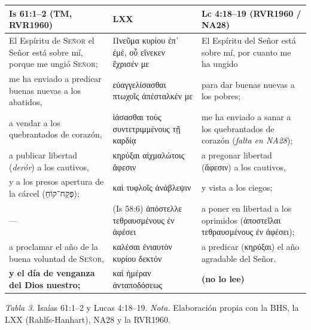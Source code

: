 \documentclass[11pt,letterpaper]{article}
\newcommand{\heb}[1]{\mbox{\foreignlanguage{hebrew}{#1}}}
\newcommand{\grc}[1]{\foreignlanguage{ancientgreek}{#1}}
\newcommand{\SENOR}{\textsc{Señor}}
\newcommand{\destacar}[1]{\textbf{\textcolor{tierraroja}{#1}}}
\newcommand{\pie}[1]{\par{\footnotesize\color{sepia}#1\par}}
\begin{document}
\begin{center}\begin{minipage}{\linewidth}\centering\small\renewcommand{\arraystretch}{1.2}
\begin{tabular}{@{}L{4.4cm}L{4.6cm}L{5.6cm}@{}}
\toprule
\textbf{Is 61:1--2 (TM, RVR1960)} & \textbf{LXX} & \textbf{Lc 4:18--19 (RVR1960 / NA28)} \\ \midrule
El Espíritu de \SENOR{} el Señor está sobre mí, porque me ungió \SENOR; & \grc{Πνεῦμα κυρίου ἐπ᾽ ἐμέ, οὗ εἵνεκεν ἔχρισέν με} & El Espíritu del Señor está sobre mí, por cuanto me ha ungido \\
me ha enviado a predicar buenas nuevas a los abatidos, & \grc{εὐαγγελίσασθαι πτωχοῖς ἀπέσταλκέν με} & para dar buenas nuevas a los pobres; \\
a vendar a los quebrantados de corazón, & \grc{ἰάσασθαι τοὺς συντετριμμένους τῇ καρδίᾳ} & me ha enviado a sanar a los quebrantados de corazón (\emph{falta en NA28}); \\
a publicar libertad (\emph{derór}) a los cautivos, & \grc{κηρύξαι αἰχμαλώτοις ἄφεσιν} & a pregonar libertad (\grc{ἄφεσιν}) a los cautivos, \\
y a los presos apertura de la cárcel (\heb{פְּקַח־קוֹחַ}); & \grc{καὶ τυφλοῖς ἀνάβλεψιν} & y vista a los ciegos; \\
--- & (Is 58:6) \grc{ἀπόστελλε τεθραυσμένους ἐν ἀφέσει} & a poner en libertad a los oprimidos (\grc{ἀποστεῖλαι τεθραυσμένους ἐν ἀφέσει}); \\
a proclamar el año de la buena voluntad de \SENOR, & \grc{καλέσαι ἐνιαυτὸν κυρίου δεκτόν} & a predicar (\grc{κηρύξαι}) el año agradable del Señor. \\
\destacar{y el día de venganza del Dios nuestro;} & \grc{καὶ ἡμέραν ἀνταποδόσεως} & \destacar{(no lo lee)} \\
\bottomrule
\end{tabular}\par
\pie{\textit{Tabla 3.} Isaías 61:1--2 y Lucas 4:18--19. \textit{Nota.} Elaboración propia con la BHS, la LXX (Rahlfs-Hanhart), NA28 y la RVR1960.}
\end{minipage}\end{center}
\end{document}
